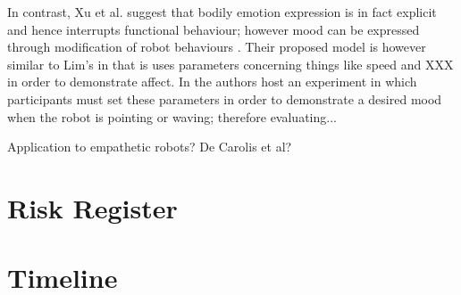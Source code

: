\documentclass[]{article}
\begin{document}
In contrast, Xu et al. suggest that bodily emotion expression is in fact explicit and hence interrupts functional behaviour; however mood can be expressed through modification of robot behaviours \cite{xu2013mood}. Their proposed model is however similar to Lim's in that is uses parameters concerning things like speed and XXX in order to demonstrate affect. In \cite{xu2013mood} the authors host an experiment in which participants must set these parameters in order to demonstrate a desired mood when the robot is pointing or waving; therefore evaluating...  

Application to empathetic robots? De Carolis et al? 


\section{Risk Register}
\section{Timeline}
\end{document}
